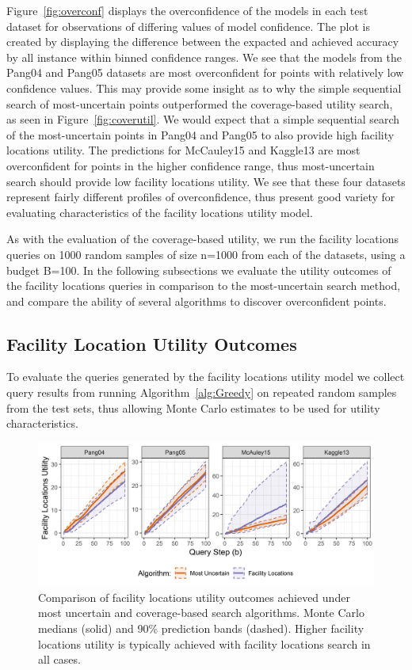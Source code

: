\documentclass[conference]{IEEEtran}
\begin{document}
Figure~\ref{fig:overconf} displays the overconfidence of the models in each test dataset for observations of differing values of model confidence. The plot is created by displaying the difference between the expacted and achieved accuracy by all instance within binned confidence ranges.  We see that the models from the Pang04 and Pang05 datasets are most overconfident for points with relatively low confidence values. This may provide some insight as to why the simple sequential search of most-uncertain points outperformed the coverage-based utility search, as seen in Figure~\ref{fig:coverutil}. We would expect that a simple sequential search of the most-uncertain points in Pang04 and Pang05 to also provide high facility locations utility. The predictions for McCauley15 and Kaggle13 are most overconfident for points in the higher confidence range, thus most-uncertain search should provide low facility locations utility. We see that these four datasets represent fairly different profiles of overconfidence, thus present good variety for evaluating characteristics of the facility locations utility model. 

As with the evaluation of the coverage-based utility, we run the facility locations queries on 1000 random samples of size n=1000 from each of the datasets, using a budget B=100. In the following subsections we evaluate the utility outcomes of the facility locations queries in comparison to the most-uncertain search method, and compare the ability of several algorithms to discover overconfident points.

\subsection{Facility Location Utility Outcomes}

To evaluate the queries generated by the facility locations utility model we collect query results from running Algorithm~\ref{alg:Greedy} on repeated random samples from the test sets, thus allowing Monte Carlo estimates to be used for utility characteristics. 

\begin{figure}[t]
 \centering
  \includegraphics[width=\textwidth]{flUtilNarrow.png}
  \caption{Comparison of facility locations utility outcomes achieved under most uncertain and coverage-based search algorithms. Monte Carlo medians (solid) and 90\% prediction bands (dashed).  Higher facility locations utility is typically achieved with facility locations search in all cases.}
  \label{fig:flutil}
\end{figure}
\end{document}
